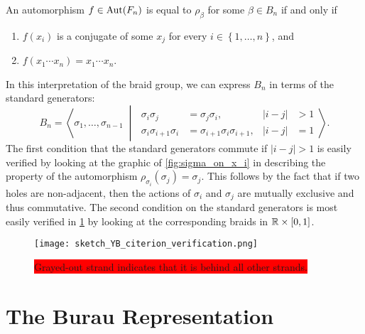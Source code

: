 \begin{theorem}
    An automorphism $f\in\textrm{Aut}\!\left( F_n \right)$ is equal to $\rho_\beta$ for some $\beta\in B_n$ if and only if
    \begin{enumerate}
        \item $f(x_i)$ is a conjugate of some $x_j$ for every $i\in\left\{ 1,\dots,n \right\}$, and
        \item $f(x_1\cdots x_n) = x_1\cdots x_n$.
    \end{enumerate}
\end{theorem}

In this interpretation of the braid group, we can express $B_n$ in terms of the standard generators:
\begin{equation}
    B_n = \left\langle \sigma_1,\dots,\sigma_{n-1} \;\middle|\;
    \begin{aligned}
        \sigma_i\sigma_j &= \sigma_j\sigma_i, & |i-j|&>1 \\
        \sigma_i\sigma_{i+1}\sigma_i &= \sigma_{i+1}\sigma_i\sigma_{i+1}, & |i-j|&=1
    \end{aligned}
    \right\rangle.
\end{equation}
The first condition that the standard generators commute if $|i-j|>1$ is easily verified by looking at the graphic of \cref{fig:sigma_on_x_i} in describing the property of the automorphism $\rho_{\sigma_i}(\sigma_j) = \sigma_j$. This follows by the fact that if two holes are non-adjacent, then the actions of $\sigma_i$ and $\sigma_j$ are mutually exclusive and thus commutative. The second condition on the standard generators is most easily verified in \cref{fig:YB_criterion_verification} by looking at the corresponding braids in $\mathbb{R}\times[0,1]$.
\begin{figure}[htbp]
    \centering
    \texttt{[image: sketch\_YB\_citerion\_verification.png]}
    \caption{\colorbox{red}{Grayed-out strand indicates that it is behind all other strands.}}\label{fig:YB_criterion_verification}
\end{figure}

\section{The Burau Representation}
